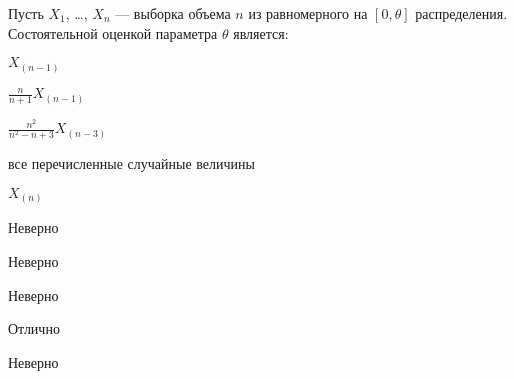 
\begin{question}
Пусть \(X_1\), \ldots, \(X_n\) — выборка объема \(n\) из равномерного
на \([0, \theta]\) распределения. Состоятельной оценкой параметра
\(\theta\) является:
\begin{answerlist}
  \item \(X_(n-1)\)
  \item \(\frac{n}{n+1} X_{(n-1)}\)
  \item \(\frac{n^2}{n^2-n+3} X_{(n-3)}\)
  \item все перечисленные случайные величины
  \item \(X_(n)\)
\end{answerlist}
\end{question}

\begin{solution}
\begin{answerlist}
  \item Неверно
  \item Неверно
  \item Неверно
  \item Отлично
  \item Неверно
\end{answerlist}
\end{solution}

